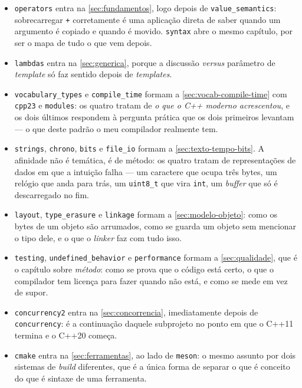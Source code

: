 \begin{itemize}
    \item \texttt{operators} entra na \cref{sec:fundamentos}, logo depois de
          \texttt{value\_semantics}: sobrecarregar \texttt{+} corretamente é
          uma aplicação direta de saber quando um argumento é copiado e quando
          é movido. \texttt{syntax} abre o mesmo capítulo, por ser o mapa de
          tudo o que vem depois.
    \item \texttt{lambdas} entra na \cref{sec:generica}, porque a discussão
           \emph{versus} parâmetro de \emph{template} só
          faz sentido depois de \emph{templates}.
    \item \texttt{vocabulary\_types} e \texttt{compile\_time} formam a
          \cref{sec:vocab-compile-time} com \texttt{cpp23} e \texttt{modules}:
          os quatro tratam de \emph{o que o C++ moderno acrescentou}, e os dois
          últimos respondem à pergunta prática que os dois primeiros levantam
          --- o que deste padrão o meu compilador realmente tem.
    \item \texttt{strings}, \texttt{chrono}, \texttt{bits} e \texttt{file\_io}
          formam a \cref{sec:texto-tempo-bits}. A afinidade não é temática, é
          de método: os quatro tratam de representações de dados em que a
          intuição falha --- um caractere que ocupa três bytes, um relógio que
          anda para trás, um \texttt{uint8\_t} que vira \texttt{int}, um
          \emph{buffer} que só é descarregado no fim.
    \item \texttt{layout}, \texttt{type\_erasure} e \texttt{linkage} formam a
          \cref{sec:modelo-objeto}: como os bytes de um objeto são arrumados,
          como se guarda um objeto sem mencionar o tipo dele, e o que o
          \emph{linker} faz com tudo isso.
    \item \texttt{testing}, \texttt{undefined\_behavior} e \texttt{performance}
          formam a \cref{sec:qualidade}, que é o capítulo sobre \emph{método}:
          como se prova que o código está certo, o que o compilador tem licença
          para fazer quando não está, e como se mede em vez de supor.
    \item \texttt{concurrency2} entra na \cref{sec:concorrencia}, imediatamente
          depois de \texttt{concurrency}: é a continuação daquele subprojeto no
          ponto em que o C++11 termina e o C++20 começa.
    \item \texttt{cmake} entra na \cref{sec:ferramentas}, ao lado de
          \texttt{meson}: o mesmo assunto por dois sistemas de \emph{build}
          diferentes, que é a única forma de separar o que é conceito do que é
          sintaxe de uma ferramenta.
\end{itemize}

